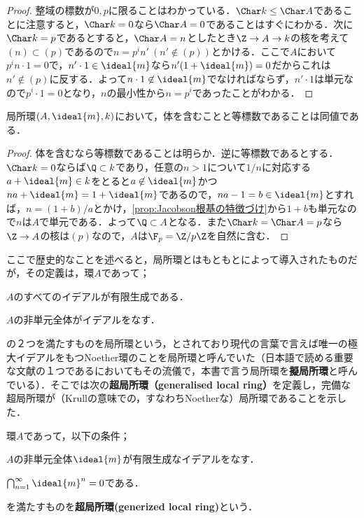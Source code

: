 \begin{proof}
	整域の標数が$0,p$に限ることはわかっている．$\Char k\leq\Char A$であることに注意すると，$\Char k=0$なら$\Char A=0$であることはすぐにわかる．次に$\Char k=p$であるとすると，$\Char A=n$としたとき$\Z\to A\to k$の核を考えて$(n)\subset(p)$であるので$n=p^in'~(n'\not\in (p))$とかける．ここで$A$において$p^in\cdot 1=0$で，$n'\cdot1\in\ideal{m}$なら$n'(1+\ideal{m})=0$だからこれは$n'\not\in (p)$に反する．よって$n\cdot1\not\in\ideal{m}$でなければならず，$n'\cdot 1$は単元なので$p^i\cdot 1=0$となり，$n$の最小性から$n=p^i$であったことがわかる．
\end{proof}

\begin{prop}
	局所環$(A,\ideal{m},k)$において，体を含むことと等標数であることは同値である．
\end{prop}

\begin{proof}
	体を含むなら等標数であることは明らか．逆に等標数であるとする．$\Char k=0$ならば$\Q\subset k$であり，任意の$n>1$について$1/n$に対応する$a+\ideal{m}\in k$をとると$a\not\in\ideal{m}$かつ$na+\ideal{m}=1+\ideal{m}$であるので，$na-1=b\in\ideal{m}$とすれば，$n=(1+b)/a$とかけ，\ref{prop:Jacobson根基の特徴づけ}から$1+b$も単元なので$n$は$A$で単元である．よって$\Q\subset A$となる．また$\Char k=\Char A=p$なら$\Z\to A$の核は$(p)$なので，$A$は$\F_p=\Z/p\Z$を自然に含む．
\end{proof}

ここで歴史的なことを述べると，局所環とはもともと\cite{Krull1938}によって導入されたものだが，その定義は，環$A$であって；
\begin{sakura}
	\item $A$のすべてのイデアルが有限生成である．
	\item $A$の非単元全体がイデアルをなす．
\end{sakura}
の２つを満たすものを局所環という，とされており現代の言葉で言えば唯一の極大イデアルをもつNoether環のことを局所環と呼んでいた（日本語で読める重要な文献の１つである\cite{Nagata1974}においてもその流儀で，本書で言う局所環を\textbf{擬局所環}と呼んでいる）．そこで\cite{Cohen1946}は次の\textbf{超局所環（generalised local ring）}を定義し，完備な超局所環が（Krullの意味での，すなわちNoetherな）局所環であることを示した．

\begin{defi}[超局所環]
	環$A$であって，以下の条件；
	\begin{sakura}
		\item $A$の非単元全体$\ideal{m}$が有限生成なイデアルをなす．
		\item $\bigcap_{n=1}^\infty \ideal{m}^n=0$である．
	\end{sakura}
	を満たすものを\textbf{超局所環(generized local ring)}という．
\end{defi} 

